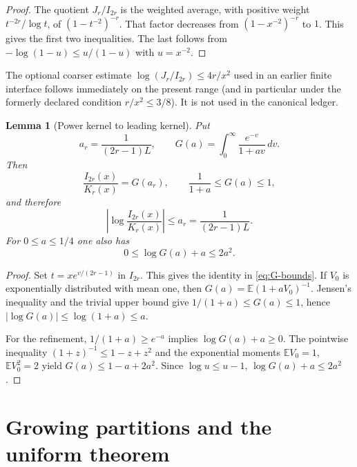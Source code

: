 \documentclass[11pt]{article}
\newtheorem{lemma}[theorem]{Lemma}
\theoremstyle{definition}
\theoremstyle{remark}
\begin{document}
\begin{proof}
The quotient $J_r/I_{2r}$ is the weighted average, with positive weight
$t^{-2r}/\log t$, of $(1-t^{-2})^{-r}$.  That factor decreases from
$(1-x^{-2})^{-r}$ to $1$.  This gives the first two inequalities.
The last follows from $-\log(1-u)\le u/(1-u)$ with $u=x^{-2}$.
\end{proof}

The optional coarser estimate $\log(J_r/I_{2r})\le4r/x^2$ used in an
earlier finite interface follows immediately on the present range (and in
particular under the formerly declared condition $r/x^2\le3/8$).  It is
not used in the canonical ledger.

\begin{lemma}[Power kernel to leading kernel]
\label{lem:I-K}
Put
\[
 a_r=\frac{1}{(2r-1)L},\qquad
 G(a)=\int_0^\infty\frac{e^{-v}}{1+av}\,dv.
\]
Then
\begin{equation}
 \frac{I_{2r}(x)}{K_r(x)}=G(a_r),\qquad
 \frac1{1+a}\le G(a)\le1,
 \label{eq:G-bounds}
\end{equation}
and therefore
\begin{equation}
 \left|\log\frac{I_{2r}(x)}{K_r(x)}\right|
 \le a_r=\frac{1}{(2r-1)L}.
 \label{eq:I-K}
\end{equation}
For $0\le a\le1/4$ one also has
\begin{equation}
 0\le\log G(a)+a\le2a^2.
 \label{eq:G-refined}
\end{equation}
\end{lemma}

\begin{proof}
Set $t=xe^{v/(2r-1)}$ in $I_{2r}$.  This gives the identity in
\eqref{eq:G-bounds}.  If $V_0$ is exponentially distributed with mean
one, then $G(a)=\mathbb E(1+aV_0)^{-1}$.  Jensen's inequality and the
trivial upper bound give $1/(1+a)\le G(a)\le1$, hence
$|\log G(a)|\le\log(1+a)\le a$.

For the refinement, $1/(1+a)\ge e^{-a}$ implies
$\log G(a)+a\ge0$.  The pointwise inequality
$(1+z)^{-1}\le1-z+z^2$ and the exponential moments
$\mathbb EV_0=1$, $\mathbb EV_0^2=2$ yield
$G(a)\le1-a+2a^2$.  Since $\log u\le u-1$,
$\log G(a)+a\le2a^2$.
\end{proof}

\section{Growing partitions and the uniform theorem}
\end{document}
